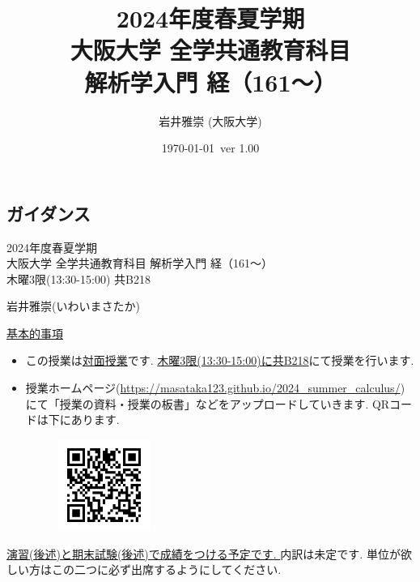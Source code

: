 \documentclass[dvipdfmx,a4paper,11pt]{article}
\title{2024年度春夏学期 \\ 大阪大学 全学共通教育科目 \\ 解析学入門 経（161〜） }
\author{岩井雅崇 (大阪大学)}
\date{\today \, ver 1.00}
\theoremstyle{definition}
\begin{document}
\maketitle
\tableofcontents
\newpage

\begin{center}
\setcounter{section}{-1}
\section{ガイダンス}
\label{sec-guide}
\end{center}

\begin{center}
{\Large 2024年度春夏学期 \\ 大阪大学 全学共通教育科目 解析学入門 経（161〜）} \\
木曜3限(13:30-15:00) 共B218
\end{center}
\begin{flushright}
 岩井雅崇(いわいまさたか) \\
\end{flushright}
{\Large \underline{基本的事項}}
\begin{itemize}
  \setlength{\parskip}{0cm} %
  \setlength{\itemsep}{0cm} %
\item この授業は\underline{対面授業}です. \underline{木曜3限(13:30-15:00)に共B218}にて授業を行います.
\item 授業ホームページ(\url{https://masataka123.github.io/2024_summer_calculus/})にて「授業の資料・授業の板書」などをアップロードしていきます. 
QRコードは下にあります.
\begin{figure}[htbp]
\begin{center}
 \includegraphics[height=30mm, width=30mm]{calculus.png}
\end{center}
\end{figure}
\end{itemize}


\underline{演習(後述)と期末試験(後述)で成績をつける予定です. } 内訳は未定です. 単位が欲しい方はこの二つに必ず出席するようにしてください. 
\end{document}
